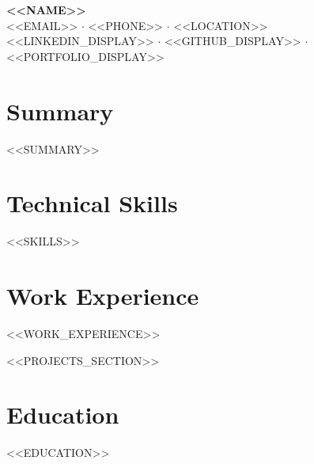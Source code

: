 \documentclass[11pt,a4paper]{article}
\newcommand{\resumename}[1]{{\LARGE\bfseries #1}}
\begin{document}
\begin{center}
  \resumename{<<NAME>>}\\[0.35em]
  <<EMAIL>> \enspace $\cdot$ \enspace <<PHONE>> \enspace $\cdot$ \enspace <<LOCATION>>\\[0.1em]
  <<LINKEDIN_DISPLAY>> \enspace $\cdot$ \enspace <<GITHUB_DISPLAY>> \enspace $\cdot$ \enspace <<PORTFOLIO_DISPLAY>>
\end{center}

\section{Summary}
<<SUMMARY>>

\section{Technical Skills}
<<SKILLS>>

\section{Work Experience}
<<WORK_EXPERIENCE>>

<<PROJECTS_SECTION>>

\section{Education}
<<EDUCATION>>
\end{document}
